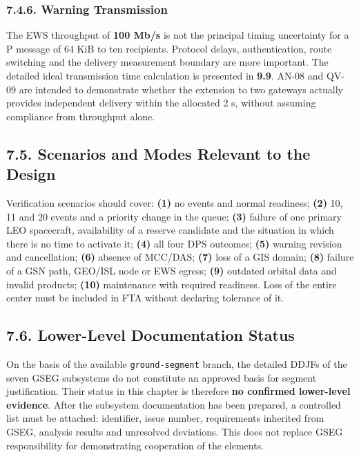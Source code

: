 \subsubsection{7.4.6. Warning Transmission}\label{ddjf-7-4-6}

The EWS throughput of \textbf{100 Mb/\allowbreak{}s} is not the principal timing uncertainty for a P message of 64 KiB to ten recipients. Protocol delays, authentication, route switching and the delivery measurement boundary are more important. The detailed ideal transmission time calculation is presented in \textbf{9.9}. AN-08 and QV-09 are intended to demonstrate whether the extension to two gateways actually provides independent delivery within the allocated 2 s, without assuming compliance from throughput alone.

\subsection{7.5. Scenarios and Modes Relevant to the Design}\label{ddjf-7-5}

Verification scenarios should cover: \textbf{(1)} no events and normal readiness; \textbf{(2)} 10, 11 and 20 events and a priority change in the queue; \textbf{(3)} failure of one primary LEO spacecraft, availability of a reserve candidate and the situation in which there is no time to activate it; \textbf{(4)} all four DPS outcomes; \textbf{(5)} warning revision and cancellation; \textbf{(6)} absence of MCC/\allowbreak{}DAS; \textbf{(7)} loss of a GIS domain; \textbf{(8)} failure of a GSN path, GEO/\allowbreak{}ISL node or EWS egress; \textbf{(9)} outdated orbital data and invalid products; \textbf{(10)} maintenance with required readiness. Loss of the entire center must be included in FTA without declaring tolerance of it.

\subsection{7.6. Lower-Level Documentation Status}\label{ddjf-7-6}

On the basis of the available \texttt{ground-\allowbreak{}segment} branch, the detailed DDJFs of the seven GSEG subsystems do not constitute an approved basis for segment justification. Their status in this chapter is therefore \textbf{no confirmed lower-level evidence}. After the subsystem documentation has been prepared, a controlled list must be attached: identifier, issue number, requirements inherited from GSEG, analysis results and unresolved deviations. This does not replace GSEG responsibility for demonstrating cooperation of the elements.

